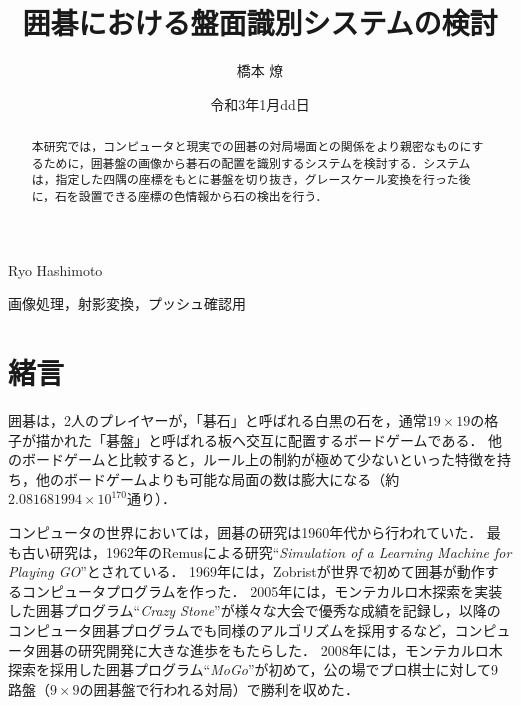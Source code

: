 \documentclass[openright]{nitocs}
\numberwithin{equation}{section}
\begin{document}
    \title{囲碁における盤面識別システムの検討}  %
    \author{橋本 燎}{Ryo Hashimoto} %
    \date{令和3年1月dd日}   %

    \begin{abstract} %
        本研究では，コンピュータと現実での囲碁の対局場面との関係をより親密なものにするために，囲碁盤の画像から碁石の配置を識別するシステムを検討する．システムは，指定した四隅の座標をもとに碁盤を切り抜き，グレースケール変換を行った後に，石を設置できる座標の色情報から石の検出を行う．\\
    \end{abstract}

    \begin{keyword} %
        画像処理，射影変換，プッシュ確認用
    \end{keyword}


    \maketitle

    \section{緒言}  
    \label{sec:format}
        囲碁は，2人のプレイヤーが，「碁石」と呼ばれる白黒の石を，通常$19\times19$の格子が描かれた「碁盤」と呼ばれる板へ交互に配置するボードゲームである．
        他のボードゲームと比較すると，ルール上の制約が極めて少ないといった特徴を持ち，他のボードゲームよりも可能な局面の数は膨大になる（約$2.081681994 \times 10^{170}$通り\cite{numbers}）．

        コンピュータの世界においては，囲碁の研究は1960年代から行われていた．
        最も古い研究は，1962年のRemusによる研究``{\it Simulation of a Learning Machine for Playing GO}''\cite{Remus}とされている．
        1969年には，Zobristが世界で初めて囲碁が動作するコンピュータプログラムを作った\cite{Zobrist}．
        2005年には，モンテカルロ木探索を実装した囲碁プログラム``{\it Crazy Stone}''\cite{CrazyStone}が様々な大会で優秀な成績を記録し，以降のコンピュータ囲碁プログラムでも同様のアルゴリズムを採用するなど，コンピュータ囲碁の研究開発に大きな進歩をもたらした．
        2008年には，モンテカルロ木探索を採用した囲碁プログラム``{\it MoGo}''が初めて，公の場でプロ棋士に対して9路盤（$9\times9$の囲碁盤で行われる対局）で勝利を収めた\cite{mogo}．
        
\end{document}
